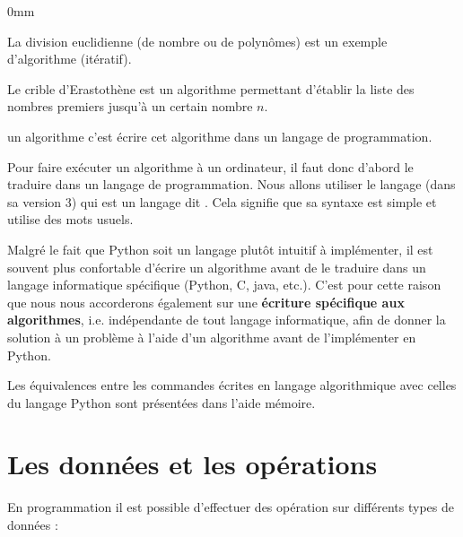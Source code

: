 \begin{exemples}{0mm}
\item La division euclidienne (de nombre ou de polynômes) est un exemple d'algorithme (itératif).
\item Le crible d'Erastothène est un algorithme permettant d'établir la liste des nombres premiers jusqu'à un certain nombre $n$.
\end{exemples}

\begin{definition}
 un algorithme c'est  écrire cet algorithme dans un langage de programmation.
\end{definition}


Pour faire exécuter un algorithme à un ordinateur, il faut donc d'abord le
traduire dans un langage de programmation. Nous allons utiliser le langage  (dans sa version 3) qui est un langage dit . Cela signifie que sa syntaxe est simple et utilise des mots usuels. 

\medskip
Malgré le fait que Python soit un langage plutôt intuitif à implémenter, il est souvent plus confortable d'écrire un algorithme  avant de le traduire dans un langage informatique spécifique (Python, C, java, etc.). C'est pour cette raison que nous nous accorderons également sur une \textbf{écriture spécifique aux algorithmes}, i.e. indépendante de tout langage informatique, afin de donner la solution à un problème à l'aide d'un algorithme avant de l'implémenter en Python.  

\medskip
Les équivalences entre les commandes écrites en langage algorithmique avec celles du langage Python sont présentées dans l'aide mémoire.

\section{Les données et les opérations}
\label{sec:donnees}

En programmation il est possible d'effectuer des opération sur différents types de données :

